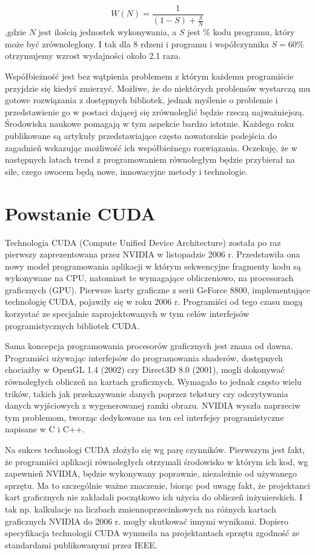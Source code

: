 \begin{equation}
W(N) = \frac{1}{(1-S) + \frac{S}{N}}
\end{equation}
,gdzie $N$ jest ilością jednostek wykonywania, a $S$ jest \% kodu programu, który może być zrównoleglony. I tak dla 8 rdzeni i programu i współczynnika $S=60\%$ otrzymujemy wzrost wydajności około 2.1 raza.

Współbieżność jest bez wątpienia problemem z którym każdemu programiście przyjdzie się kiedyś zmierzyć. Możliwe, że do niektórych problemów wystarczą mu gotowe rozwiązania z dostępnych bibliotek, jednak myślenie o problemie i przedstawienie go w postaci dającej się zrównoleglić będzie rzeczą najważniejszą. Środowiska naukowe pomagają w tym aspekcie bardzo istotnie. Każdego roku publikowane są artykuły przedstawiające często nowatorskie podejścia do zagadnieñ wskazując możliwość ich współbieżnego rozwiązania. Oczekuję, że w następnych latach trend z programowaniem równoległym będzie przybierał na sile, czego owocem będą nowe, innowacyjne metody i technologie.

\section{Powstanie CUDA}

Technologia CUDA (Compute Unified Device Architecture) została po raz pierwszy zaprezentowana przez NVIDIA w listopadzie 2006 r. Przedstawiła ona nowy model programowania aplikacji w którym sekwencyjne fragmenty kodu są wykonywane na CPU, natomiast te wymagające obliczeniowo, na procesorach graficznych (GPU). Pierwsze karty graficzne z serii GeForce 8800, implementujące technologię CUDA, pojawiły się w roku 2006 r. Programiści od tego czasu mogą korzystać ze specjalnie zaprojektowanych w tym celów interfejsów programistycznych bibliotek CUDA.

Sama koncepcja programowania procesorów graficznych jest znana od dawna. Programiści używając interfejsów do programowania shaderów, dostępnych chociażby w OpenGL 1.4 (2002) czy Direct3D 8.0 (2001), mogli dokonywać równoległych obliczeñ na kartach graficznych. Wymagało to jednak często wielu trików, takich jak przekazywanie danych poprzez tekstury czy odczytywania danych wyjściowych z wygenerowanej ramki obrazu. NVIDIA wyszła naprzeciw tym problemom, tworząc dedykowane na ten cel interfejsy programistyczne napisane w C i C++.

Na sukces technologi CUDA złożyło się wg \cite{massive} parę czynników. Pierwszym jest fakt, że programiści aplikacji równoległych otrzymali środowisko w którym ich kod, wg zapewnieñ NVIDIA, będzie wykonywany poprawnie, niezależnie od używanego sprzętu. Ma to szczególnie ważne znaczenie, biorąc pod uwagę fakt, że projektanci kart graficznych nie zakładali początkowo ich użycia do obliczeñ inżynierskich. I tak np. kalkulacje na liczbach zmiennoprzecinkowych na różnych kartach graficznych NVIDIA do 2006 r. mogły skutkować innymi wynikami. Dopiero specyfikacja technologii CUDA wymusiła na projektantach sprzętu zgodność ze standardami publikowanymi przez IEEE.

